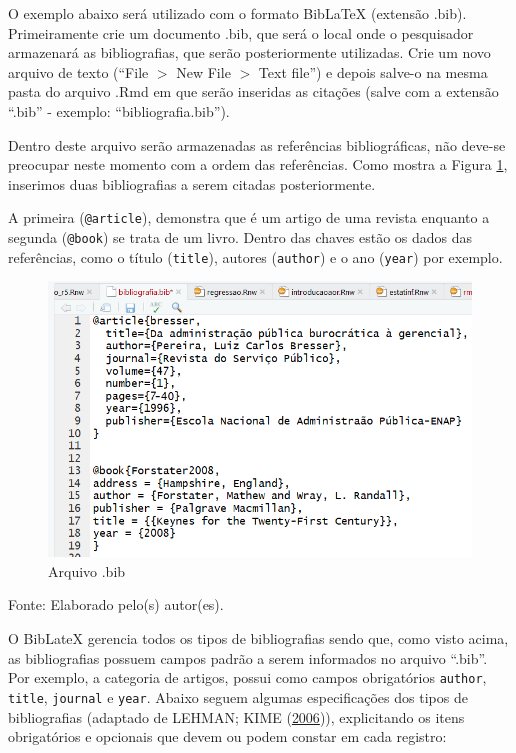 \documentclass[12pt,brazil,oneside]{book}
\begin{document}
O exemplo abaixo será utilizado com o formato BibLaTeX (extensão .bib). Primeiramente crie um documento .bib, que será o local onde o pesquisador armazenará as bibliografias, que serão posteriormente utilizadas. Crie um novo arquivo de texto (``File \(>\) New File \(>\) Text file'') e depois salve-o na mesma pasta do arquivo .Rmd em que serão inseridas as citações (salve com a extensão ``.bib'' - exemplo: ``bibliografia.bib'').

Dentro deste arquivo serão armazenadas as referências bibliográficas, não deve-se preocupar neste momento com a ordem das referências. Como mostra a Figura \ref{fig:rmarkbib}, inserimos duas bibliografias a serem citadas posteriormente.

A primeira (\texttt{@article}), demonstra que é um artigo de uma revista enquanto a segunda (\texttt{@book}) se trata de um livro. Dentro das chaves estão os dados das referências, como o título (\texttt{title}), autores (\texttt{author}) e o ano (\texttt{year}) por exemplo.

\begin{figure}[H]

{\centering \includegraphics[width=0.8\linewidth]{rmarkbib} 

}

\caption{Arquivo .bib}\label{fig:rmarkbib}
\end{figure}

Fonte: Elaborado pelo(s) autor(es).

O BibLateX gerencia todos os tipos de bibliografias sendo que, como visto acima, as bibliografias possuem campos padrão a serem informados no arquivo ``.bib''. Por exemplo, a categoria de artigos, possui como campos obrigatórios \texttt{author}, \texttt{title}, \texttt{journal} e \texttt{year}. Abaixo seguem algumas especificações dos tipos de bibliografias (adaptado de LEHMAN; KIME (\protect\hyperlink{ref-biblatex}{2006})), explicitando os itens obrigatórios e opcionais que devem ou podem constar em cada registro:
\end{document}
